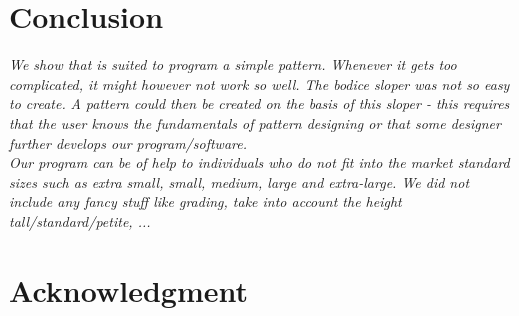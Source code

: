 \documentclass[10pt,letterpaper]{ltugboat}
\begin{document}
\section{Conclusion}
\textit{We show that \MP { }is suited to program a simple pattern. Whenever it gets too complicated, it might however not work so well. The bodice sloper was not so easy to create.}
\textit{A pattern could then be created on the basis of this sloper - this requires that the user knows the fundamentals of pattern designing or that some designer further develops our program/software.}\\ 
\textit{Our program can be of help to individuals who do not fit into the market standard sizes such as extra small, small, medium, large and extra-large.
\textit{We did not include any fancy stuff like grading, take into account the height tall/standard/petite, ...}}


\section*{Acknowledgment}
\end{document}
